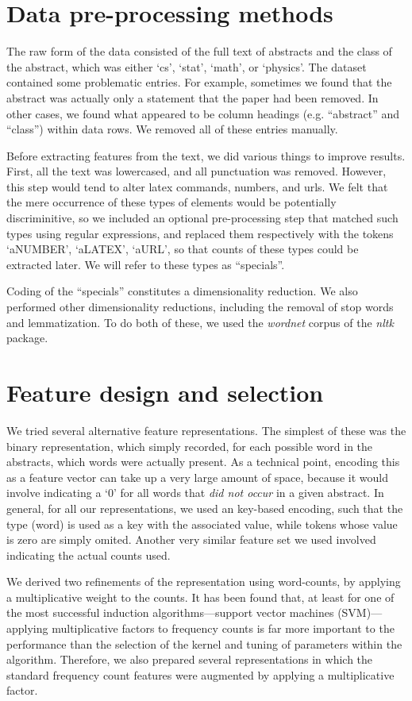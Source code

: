 \documentclass[conference,letterpaper]{IEEEtran}
\begin{document}
\section{Data pre-processing methods}
The raw form of the data consisted of the full text of abstracts and the
class of the abstract, which was either `cs', `stat', `math', or `physics'.
The dataset contained some problematic entries.  For example, sometimes we
found that the abstract was actually only a statement that the paper had been
removed.  In other cases, we found what appeared to be column headings (e.g.
``abstract'' and ``class'') within data rows.  We removed all of these entries
manually.

Before extracting features from the text, we did various things to improve
results.  First, all the text was lowercased, and all punctuation was 
removed.  However, this step would tend to alter latex commands, numbers,
and urls.  We felt that the mere occurrence of these types of elements would
be potentially discriminitive, so we included an optional pre-processing step
that matched such types using regular expressions, and replaced them 
respectively with the tokens `aNUMBER', `aLATEX', `aURL', so that counts of
these types could be extracted later.  We will refer to these types as 
``specials''.

Coding of the ``specials'' constitutes a dimensionality reduction.  We also
performed other dimensionality reductions, including the removal of 
stop words and lemmatization.  To do both of these, we used the
\textit{wordnet} corpus of the \textit{nltk} package.

 
\section{Feature design and selection}
We tried several alternative feature representations.  The simplest of these
was the binary representation, which simply recorded, for each possible 
word in the abstracts, which words were actually present.  As a technical
point, encoding this as a feature vector can take up a very large amount of
space, because it would involve indicating a `0' for all words that 
\textit{did not occur} in a given abstract.  In general, for all our 
representations, we used an key-based encoding, such that the type (word)
is used as a key with the associated value, while tokens whose value is 
zero are simply omited.  Another very similar feature set we used involved 
indicating the actual counts used.

We derived two refinements of the representation using word-counts, by applying
a multiplicative weight to the counts.  It has been found that, at least for
one of the most successful induction algorithms---support vector machines 
(SVM)---applying multiplicative factors to frequency counts is far more 
important to the performance than the selection of the kernel and tuning of 
parameters within the algorithm.  Therefore, we also prepared several 
representations in which the standard frequency count features were augmented
by applying a multiplicative factor.
\end{document}

